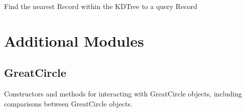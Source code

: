 \documentclass[letterpaper,10pt,english]{sphinxmanual}
\begin{document}
\begin{fulllineitems}
\begin{fulllineitems}
\label{\detokenize{kdtree:GeoSpatialTools.kdtree.KDTree.query}}
\pysigstartsignatures
\pysiglinewithargsret
{}
{}
{}
\pysigstopsignatures
\sphinxAtStartPar
Find the nearest Record within the KDTree to a query Record
\begin{quote}\begin{description}
\sphinxAtStartPar
{}

\end{description}\end{quote}

\end{fulllineitems}


\end{fulllineitems}


\sphinxstepscope


\chapter{Additional Modules}
\label{\detokenize{users_guide:module-GeoSpatialTools.great_circle}}\label{\detokenize{users_guide:additional-modules}}\label{\detokenize{users_guide::doc}}

\section{GreatCircle}
\label{\detokenize{users_guide:greatcircle}}
\sphinxAtStartPar
Constructors and methods for interacting with GreatCircle objects, including
comparisons between GreatCircle objects.
\end{document}
